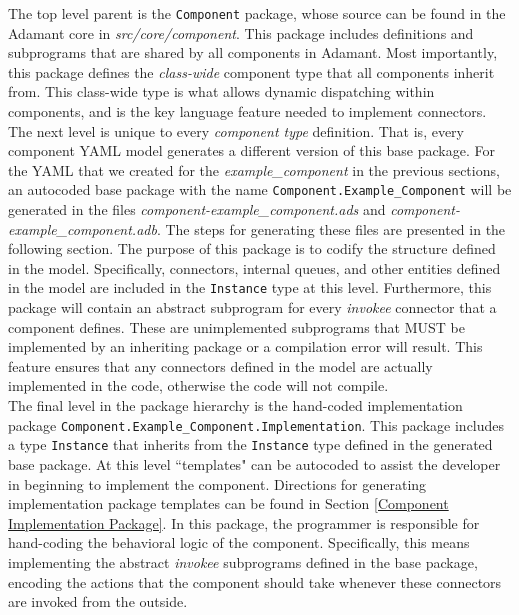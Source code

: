 The top level parent is the \texttt{Component} package, whose source can be found in the Adamant core in \textit{src/core/component}. This package includes definitions and subprograms that are shared by all components in Adamant. Most importantly, this package defines the \textit{class-wide} component type that all components inherit from. This class-wide type is what allows dynamic dispatching within components, and is the key language feature needed to implement connectors. \\

The next level is unique to every \textit{component type} definition. That is, every component YAML model generates a different version of this base package. For the YAML that we created for the \textit{example\_component} in the previous sections, an autocoded base package with the name \texttt{Component.Example\_Component} will be generated in the files \textit{component-example\_component.ads} and \textit{component-example\_component.adb}. The steps for generating these files are presented in the following section. The purpose of this package is to codify the structure defined in the model. Specifically, connectors, internal queues, and other entities defined in the model are included in the \texttt{Instance} type at this level. Furthermore, this package will contain an abstract subprogram for every \textit{invokee} connector that a component defines. These are unimplemented subprograms that MUST be implemented by an inheriting package or a compilation error will result. This feature ensures that any connectors defined in the model are actually implemented in the code, otherwise the code will not compile. \\

The final level in the package hierarchy is the hand-coded implementation package \texttt{Component.Example\_Component.Implementation}. This package includes a type \texttt{Instance} that inherits from the \texttt{Instance} type defined in the generated base package. At this level ``templates" can be autocoded to assist the developer in beginning to implement the component. Directions for generating implementation package templates can be found in Section \ref{Component Implementation Package}. In this package, the programmer is responsible for hand-coding the behavioral logic of the component. Specifically, this means implementing the abstract \textit{invokee} subprograms defined in the base package, encoding the actions that the component should take whenever these connectors are invoked from the outside. \\

